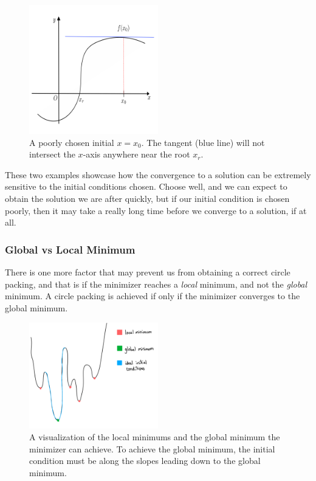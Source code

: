 \begin{figure}[htbp]
    \centering
    \includegraphics[width = 0.5\textwidth]{Chapter 4/10. bad newton raphson.png}
    \caption{A poorly chosen initial $x=x_0$. The tangent (blue line) will not intersect the $x$-axis anywhere near the root $x_r$.}
    \label{fig: bad newton}
\end{figure}

\vspace{-4mm}
\begin{flushleft}
These two examples showcase how the convergence to a solution can be extremely sensitive to the initial conditions chosen. Choose well, and we can expect to obtain the solution we are after quickly, but if our initial condition is chosen poorly, then it may take a really long time before we converge to a solution, if at all.
\end{flushleft}

\subsubsection{Global vs Local Minimum}

\begin{flushleft}
There is one more factor that may prevent us from obtaining a correct circle packing, and that is if the minimizer reaches a \textit{local} minimum, and not the \textit{global} minimum. A circle packing is achieved if only if the minimizer converges to the global minimum. 
\end{flushleft}

\begin{figure}[htbp]
    \centering
    \includegraphics[width = 0.5\textwidth]{Chapter 4/11. energy.png}
    \caption{A visualization of the local minimums and the global minimum the minimizer can achieve. To achieve the global minimum, the initial condition must be along the slopes leading down to the global minimum.}
    \label{fig4: minimum}
\end{figure}

